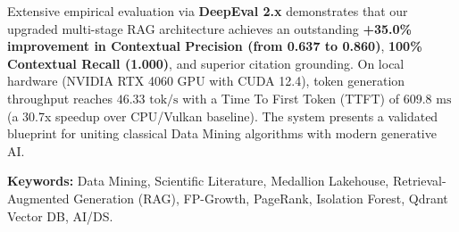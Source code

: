 Extensive empirical evaluation via \textbf{DeepEval 2.x} demonstrates that our upgraded multi-stage RAG architecture achieves an outstanding \textbf{+35.0\% improvement in Contextual Precision (from 0.637 to 0.860)}, \textbf{100\% Contextual Recall (1.000)}, and superior citation grounding. On local hardware (NVIDIA RTX 4060 GPU with CUDA 12.4), token generation throughput reaches $46.33\text{ tok/s}$ with a Time To First Token (TTFT) of $609.8\text{ ms}$ (a 30.7x speedup over CPU/Vulkan baseline). The system presents a validated blueprint for uniting classical Data Mining algorithms with modern generative AI.

\vspace{0.4cm}
\noindent\textbf{Keywords:} Data Mining, Scientific Literature, Medallion Lakehouse, Retrieval-Augmented Generation (RAG), FP-Growth, PageRank, Isolation Forest, Qdrant Vector DB, AI/DS.
